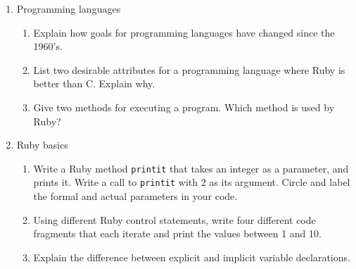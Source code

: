 \documentclass[11pt]{article}
\begin{document}

  \begin{enumerate}

    \addtolength{\itemsep}{6mm}

    \item Programming languages

          \vspace{-1.5mm}

          \begin{enumerate}

            \addtolength{\itemsep}{3mm}

            \item Explain how goals for programming languages have changed
                  since the 1960’s.

            \item List two desirable attributes for a programming language
                  where Ruby is better than C.  Explain why.

            \item Give two methods for executing a program.  Which method is
                  used by Ruby?

          \end{enumerate}

    \item Ruby basics

          \vspace{-1.5mm}

          \begin{enumerate}

            \addtolength{\itemsep}{3mm}

            \item Write a Ruby method \texttt{printit} that takes an integer
                  as a parameter, and prints it.  Write a call to
                  \texttt{printit} with 2 as its argument.  Circle and label
                  the formal and actual parameters in your code.

            \item Using different Ruby control statements, write four
                  different code fragments that each iterate and print the
                  values between 1 and 10.

            \item Explain the difference between explicit and implicit
                  variable declarations.


\end{enumerate}
\end{enumerate}
\end{document}
